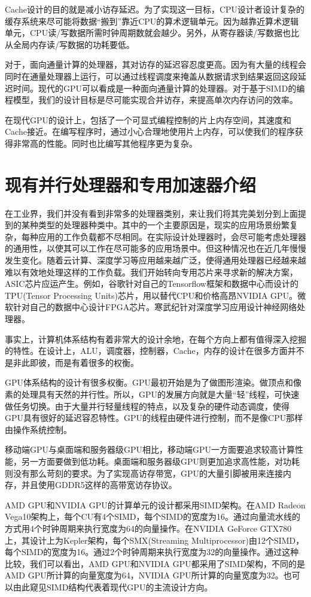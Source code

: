 Cache设计的目的就是减小访存延迟。为了实现这一目标，CPU设计者设计复杂的缓存系统来尽可能将数据“搬到”靠近CPU的算术逻辑单元。因为越靠近算术逻辑单元，CPU读/写数据所需时钟周期数就会越少。另外，从寄存器读/写数据也比从全局内存读/写数据的功耗要低。

对于，面向通量计算的处理器，其对访存的延迟容忍度更高。因为有大量的线程会同时在通量处理器上运行，可以通过线程调度来掩盖从数据请求到结果返回这段延迟时间。现代的GPU可以看成是一种面向通量计算的处理器。对于基于SIMD的编程模型，我们的设计目标是尽可能实现合并访存，来提高单次内存访问的效率。

在现代GPU的设计上，包括了一个可显式编程控制的片上内存空间，其速度和Cache接近。在编写程序时，通过小心合理地使用片上内存，可以使我们的程序获得非常高的性能。同时也比编写其他程序更为复杂。



\section{现有并行处理器和专用加速器介绍}
在工业界，我们并没有看到非常多的处理器类别，来让我们将其完美划分到上面提到的某种类型的处理器种类中。其中的一个主要原因是，现实的应用场景纷繁复杂，每种应用的工作负载都不尽相同。在实际设计处理器时，会尽可能考虑处理器的通用性，以使其可以工作在尽可能多的应用场景中。但这种情况也在近几年慢慢发生变化。随着云计算、深度学习等应用越来越广泛，使得通用处理器已经越来越难以有效地处理这样的工作负载。我们开始转向专用芯片来寻求新的解决方案，ASIC芯片应运产生。例如，谷歌针对自己的Tensorflow框架和数据中心而设计的TPU(Tensor Processing Units)芯片，用以替代CPU和价格高昂NVIDIA GPU。微软针对自己的数据中心设计FPGA芯片。寒武纪针对深度学习应用设计神经网络处理器。

事实上，计算机体系结构有着非常大的设计余地，在每个方向上都有值得深入挖掘的特性。在设计上，ALU，调度器，控制器，Cache，内存的设计在很多方面并不是非此即彼，而是有着很多的权衡。

GPU体系结构的设计有很多权衡。GPU最初开始是为了做图形渲染。做顶点和像素的处理具有天然的并行性。所以，GPU的发展方向就是大量“轻”线程，可快速做任务切换。由于大量并行轻量线程的特点，以及复杂的硬件动态调度，使得GPU具有很好的延迟容忍特性。GPU的线程由硬件进行控制，而不是像CPU那样由操作系统控制。

移动端GPU与桌面端和服务器级GPU相比，移动端GPU一方面要追求较高计算性能，另一方面要做到低功耗。桌面端和服务器级GPU则更加追求高性能，对功耗则没有那么苛刻的要求。为了实现高访存带宽，GPU的大量引脚被用来连接内存，并且使用GDDR5这样的高带宽访存协议。

AMD GPU和NVIDIA GPU的计算单元的设计都采用SIMD架构。在AMD Radeon Vega10架构上，每个CU有4个SIMD，每个SIMD的宽度为16。通过向量流水线的方式用4个时钟周期来执行宽度为64的向量操作。在NVIDIA GeForce GTX780上，其设计上为Kepler架构，每个SMX(Streaming Multiprocessor)由12个SIMD，每个SIMD的宽度为16。通过2个时钟周期来执行宽度为32的向量操作。通过这种比较，我们可以看出，AMD GPU和NVIDIA GPU都采用了SIMD架构，不同的是AMD GPU所计算的向量宽度为64，NVIDIA GPU所计算的向量宽度为32。也可以由此窥见SIMD结构代表着现代GPU的主流设计方向。

